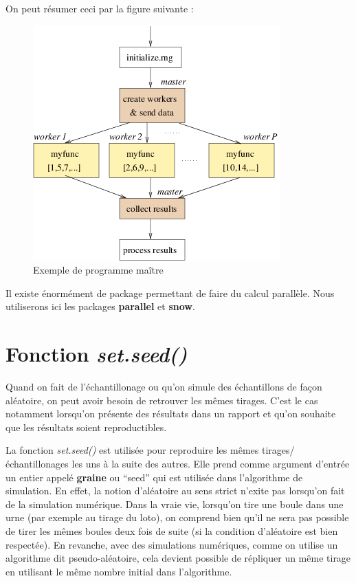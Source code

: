 \documentclass[
]{book}
\theoremstyle{definition}
\theoremstyle{definition}
\theoremstyle{definition}
\theoremstyle{definition}
\theoremstyle{remark}
\begin{document}
On peut résumer ceci par la figure suivante :

\begin{figure}
\centering
\includegraphics{Figures/Figure2.png}
\caption{Exemple de programme maître}
\end{figure}

Il existe énormément de package permettant de faire du calcul parallèle. Nous utiliserons ici les packages \textbf{parallel} et \textbf{snow}.

\hypertarget{fonction-set.seed}{%
\section{\texorpdfstring{Fonction \emph{set.seed()}}{Fonction set.seed()}}\label{fonction-set.seed}}

Quand on fait de l'échantillonage ou qu'on simule des échantillons de façon aléatoire, on peut avoir besoin de retrouver les mêmes tirages. C'est le cas notamment lorsqu'on présente des résultats dans un rapport et qu'on souhaite que les résultats soient reproductibles.

La fonction \emph{set.seed()} est utilisée pour reproduire les mêmes tirages/échantillonages les uns à la suite des autres. Elle prend comme argument d'entrée un entier appelé \textbf{graine} ou ``seed'' qui est utilisée dans l'algorithme de simulation. En effet, la notion d'aléatoire au sens strict n'exite pas lorsqu'on fait de la simulation numérique. Dans la vraie vie, lorsqu'on tire une boule dans une urne (par exemple au tirage du loto), on comprend bien qu'il ne sera pas possible de tirer les mêmes boules deux fois de suite (si la condition d'aléatoire est bien respectée). En revanche, avec des simulations numériques, comme on utilise un algorithme dit pseudo-aléatoire, cela devient possible de répliquer un même tirage en utilisant le même nombre initial dans l'algorithme.
\end{document}
